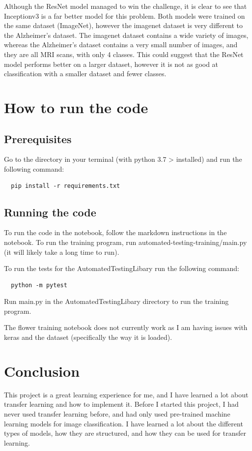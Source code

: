 \documentclass[]{final_report}
\begin{document}
Although the ResNet model managed to win the challenge, it is clear to see that Inceptionv3 is a far better model for this problem.
Both models were trained on the same dataset (ImageNet), however the imagenet dataset is very different to the Alzheimer's dataset.
The imagenet dataset contains a wide variety of images, whereas the Alzheimer's dataset contains a very small number of images, and they are all MRI scans, with only 4 classes.
This could suggest that the ResNet model performs better on a larger dataset, however it is not as good at classification with a smaller dataset and fewer classes.

\chapter{How to run the code}

\section{Prerequisites}
Go to the directory in your terminal (with python 3.7 > installed) and run the following command:
\begin{lstlisting}
  pip install -r requirements.txt
\end{lstlisting}

\section{Running the code}
To run the code in the notebook, follow the markdown instructions in the notebook.
To run the training program, run automated-testing-training/main.py (it will likely take a long time to run).

To run the tests for the AutomatedTestingLibary run the following command:
\begin{lstlisting}
  python -m pytest 
\end{lstlisting}
Run main.py in the AutomatedTestingLibary directory to run the training program.

The flower training notebook does not currently work as I am having issues with keras and the dataset (specifically the way it is loaded).


\chapter{Conclusion}

This project is a great learning experience for me, and I have learned a lot about transfer learning and how to implement it.
Before I started this project, I had never used transfer learning before, and had only used pre-trained machine learning models for image classification.
I have learned a lot about the different types of models, how they are structured, and how they can be used for transfer learning.
\end{document}
